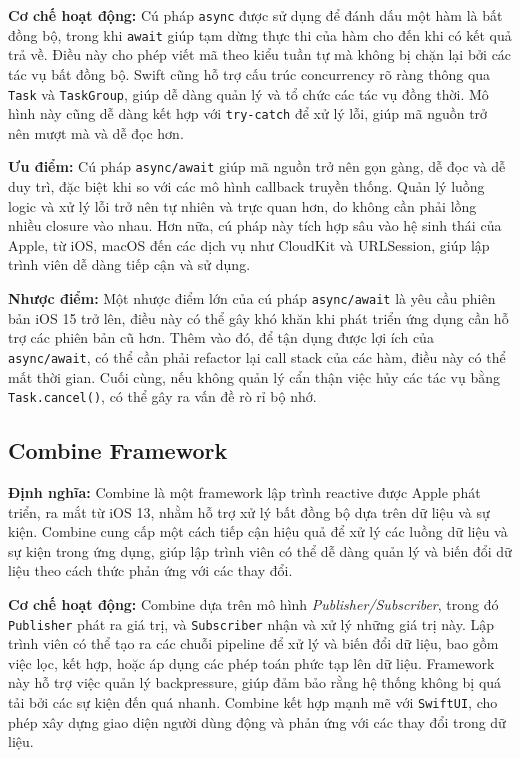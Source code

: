 \vspace{0.5em}

\textbf{Cơ chế hoạt động:} Cú pháp \texttt{async} được sử dụng để đánh dấu một hàm là bất đồng bộ, trong khi \texttt{await} giúp tạm dừng thực thi của hàm cho đến khi có kết quả trả về. Điều này cho phép viết mã theo kiểu tuần tự mà không bị chặn lại bởi các tác vụ bất đồng bộ. Swift cũng hỗ trợ cấu trúc concurrency rõ ràng thông qua \texttt{Task} và \texttt{TaskGroup}, giúp dễ dàng quản lý và tổ chức các tác vụ đồng thời. Mô hình này cũng dễ dàng kết hợp với \texttt{try-catch} để xử lý lỗi, giúp mã nguồn trở nên mượt mà và dễ đọc hơn.

\vspace{0.5em}

\textbf{Ưu điểm:} Cú pháp \texttt{async/await} giúp mã nguồn trở nên gọn gàng, dễ đọc và dễ duy trì, đặc biệt khi so với các mô hình callback truyền thống. Quản lý luồng logic và xử lý lỗi trở nên tự nhiên và trực quan hơn, do không cần phải lồng nhiều closure vào nhau. Hơn nữa, cú pháp này tích hợp sâu vào hệ sinh thái của Apple, từ iOS, macOS đến các dịch vụ như CloudKit và URLSession, giúp lập trình viên dễ dàng tiếp cận và sử dụng.

\vspace{0.5em}

\textbf{Nhược điểm:} Một nhược điểm lớn của cú pháp \texttt{async/await} là yêu cầu phiên bản iOS 15 trở lên, điều này có thể gây khó khăn khi phát triển ứng dụng cần hỗ trợ các phiên bản cũ hơn. Thêm vào đó, để tận dụng được lợi ích của \texttt{async/await}, có thể cần phải refactor lại call stack của các hàm, điều này có thể mất thời gian. Cuối cùng, nếu không quản lý cẩn thận việc hủy các tác vụ bằng \texttt{Task.cancel()}, có thể gây ra vấn đề rò rỉ bộ nhớ.

\subsection{Combine Framework}

\textbf{Định nghĩa:} Combine là một framework lập trình reactive được Apple phát triển, ra mắt từ iOS 13, nhằm hỗ trợ xử lý bất đồng bộ dựa trên dữ liệu và sự kiện. Combine cung cấp một cách tiếp cận hiệu quả để xử lý các luồng dữ liệu và sự kiện trong ứng dụng, giúp lập trình viên có thể dễ dàng quản lý và biến đổi dữ liệu theo cách thức phản ứng với các thay đổi.

\vspace{0.5em}

\textbf{Cơ chế hoạt động:} Combine dựa trên mô hình \textit{Publisher/Subscriber}, trong đó \texttt{Publisher} phát ra giá trị, và \texttt{Subscriber} nhận và xử lý những giá trị này. Lập trình viên có thể tạo ra các chuỗi pipeline để xử lý và biến đổi dữ liệu, bao gồm việc lọc, kết hợp, hoặc áp dụng các phép toán phức tạp lên dữ liệu. Framework này hỗ trợ việc quản lý backpressure, giúp đảm bảo rằng hệ thống không bị quá tải bởi các sự kiện đến quá nhanh. Combine kết hợp mạnh mẽ với \texttt{SwiftUI}, cho phép xây dựng giao diện người dùng động và phản ứng với các thay đổi trong dữ liệu.

